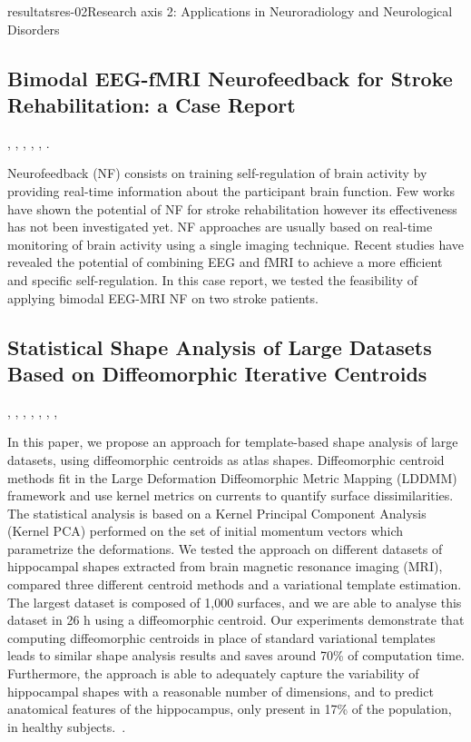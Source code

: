\documentclass{ra2018}
\begin{document}
\begin{module}{resultats}{res-02}{Research axis 2: Applications in Neuroradiology and Neurological Disorders}

\subsection{Bimodal EEG-fMRI Neurofeedback for Stroke Rehabilitation: a Case Report}
\begin{participants}
      , 
      , 
      ,
      ,
      ,
      .
\end{participants}
Neurofeedback  (NF)  consists  on  training  self-regulation  of  brain  activity  by  providing  real-time information about the participant brain function.  Few works have shown the potential of NF for stroke rehabilitation however its effectiveness has not been investigated yet. NF approaches are usually based on real-time monitoring of brain activity using a single imaging technique.  Recent studies have revealed the potential of combining EEG and fMRI to achieve a more efficient and specific self-regulation. In this case report, we tested the feasibility of applying bimodal EEG-MRI NF on two stroke patients.~\cite{lioi:inserm-01932954}

\subsection{Statistical Shape Analysis of Large Datasets Based on Diffeomorphic Iterative Centroids}
\begin{participants}
      , 
      ,
      ,
      ,
      ,
      ,
      ,
\end{participants}
In this paper, we propose an approach for template-based shape analysis of large datasets, using diffeomorphic centroids as atlas shapes. Diffeomorphic centroid methods fit in the Large Deformation Diffeomorphic Metric Mapping (LDDMM) framework and use kernel metrics on currents to quantify surface dissimilarities. The statistical analysis is based on a Kernel Principal Component Analysis (Kernel PCA) performed on the set of initial momentum vectors which parametrize the deformations. We tested the approach on different datasets of hippocampal shapes extracted from brain magnetic resonance imaging (MRI), compared three different centroid methods and a variational template estimation. The largest dataset is composed of 1,000 surfaces, and we are able to analyse this dataset in 26 h using a diffeomorphic centroid. Our experiments demonstrate that computing diffeomorphic centroids in place of standard variational templates leads to similar shape analysis results and saves around 70\% of computation time. Furthermore, the approach is able to adequately capture the variability of hippocampal shapes with a reasonable number of dimensions, and to predict anatomical features of the hippocampus, only present in 17\% of the population, in healthy subjects.~\cite{cury:hal-01920263}.



\end{module}
\end{document}
